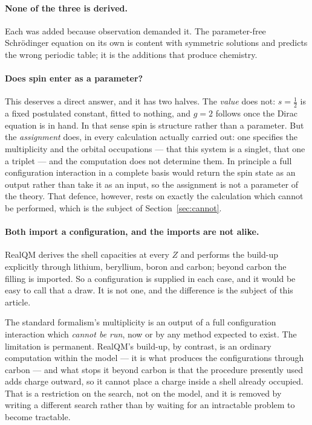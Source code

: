 \documentclass[11pt]{article}
\begin{document}
\paragraph{None of the three is derived.} Each was added because observation demanded it. The
parameter-free Schr\"odinger equation on its own is content with symmetric solutions and predicts
the wrong periodic table; it is the additions that produce chemistry.

\paragraph{Does spin enter as a parameter?} This deserves a direct answer, and it has two halves.
The \emph{value} does not: $s = \tfrac12$ is a fixed postulated constant, fitted to nothing, and
$g=2$ follows once the Dirac equation is in hand. In that sense spin is structure rather than a
parameter. But the \emph{assignment} does, in every calculation actually carried out: one
specifies the multiplicity and the orbital occupations --- that this system is a singlet, that one
a triplet --- and the computation does not determine them. In principle a full configuration
interaction in a complete basis would return the spin state as an output rather than take it as
an input, so the assignment is not a parameter of the theory. That defence, however, rests on
exactly the calculation which cannot be performed, which is the subject of
Section~\ref{sec:cannot}.

\paragraph{Both import a configuration, and the imports are not alike.} RealQM derives the shell
capacities at every $Z$ and performs the build-up explicitly through lithium, beryllium, boron and
carbon; beyond carbon the filling is imported. So a configuration is supplied in each case, and it
would be easy to call that a draw. It is not one, and the difference is the subject of this
article.

The standard formalism's multiplicity is an output of a full configuration interaction which
\emph{cannot be run}, now or by any method expected to exist. The limitation is permanent. RealQM's
build-up, by contrast, is an ordinary computation within the model --- it is what produces the
configurations through carbon --- and what stops it beyond carbon is that the procedure presently
used adds charge outward, so it cannot place a charge inside a shell already occupied. That is a
restriction on the search, not on the model, and it is removed by writing a different search rather
than by waiting for an intractable problem to become tractable.
\end{document}
